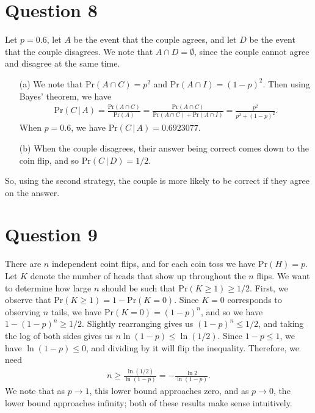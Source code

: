 \documentclass[10pt]{article}
\begin{document}
\section{Question 8} \noindent
Let \(p = 0.6\), let \(A\) be the event that the couple agrees, and let \(D\) be the event that the couple disagrees. We note that \(A \cap D = \emptyset\), 
since the couple cannot agree and disagree at the same time. 
\begin{itemize}
    \item[(a)] We note that \(\mathrm{Pr}(A \cap C) = p^2\) and \(\mathrm{Pr}(A \cap I) = (1-p)^2\). Then using Bayes' theorem, we have 
    \begin{align*}
        \mathrm{Pr}(C \,|\, A) = \frac{\mathrm{Pr}(A \cap C)}{\mathrm{Pr}(A)} = \frac{\mathrm{Pr}(A \cap C)}{\mathrm{Pr}(A \cap C) + \mathrm{Pr}(A \cap I)} 
        = \frac{p^2}{p^2 + (1-p)^2}.
    \end{align*}
    When \(p = 0.6\), we have \(\mathrm{Pr}(C \,|\, A) = 0.6923077\).
    \item[(b)] When the couple disagrees, their answer being correct comes down to the coin flip, and so \(\mathrm{Pr}(C \,|\, D) = 1/2\). 
\end{itemize}
So, using the second strategy, the couple is more likely to be correct if they agree on the answer. 

\section{Question 9} \noindent
There are \(n\) independent coint flips, and for each coin toss we have \(\mathrm{Pr}(H) = p\). Let \(K\) denote the number of heads that show up throughout
the \(n\) flips. We want to determine how large \(n\) should be such that \(\mathrm{Pr}(K \ge 1) \ge 1/2\). First, we observe that \(\mathrm{Pr}(K \ge 1) = 
1 - \mathrm{Pr}(K = 0)\). Since \(K = 0\) corresponds to observing \(n\) tails, we have \(\mathrm{Pr}(K = 0) = (1-p)^n\), and so we have 
\(1 - (1-p)^n \ge 1/2\). Slightly rearranging gives us \((1-p)^n \le 1/2\), and taking the log of both sides gives us \(n \ln(1 - p) \le \ln(1/2)\). Since 
\(1 - p \le 1\), we have \(\ln(1-p) \le 0\), and dividing by it will flip the inequality. Therefore, we need 
\begin{align*}
    n \ge \frac{\ln(1/2)}{\ln(1-p)} = - \frac{\ln 2}{\ln (1-p)}.
\end{align*}
We note that as \(p \to 1\), this lower bound approaches zero, and as \(p \to 0\), the lower bound approaches infinity; 
both of these results make sense intuitively. 
\end{document}
